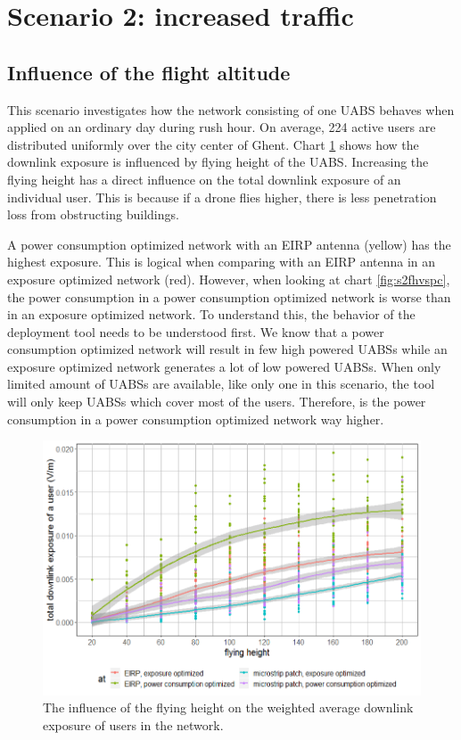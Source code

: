 \section{Scenario 2: increased traffic}

\subsection{Influence of the flight altitude}
This scenario investigates how the network consisting of one \gls{UABS} behaves when applied on an ordinary day during rush hour. 
On average, 224 active users are distributed uniformly over the city center of Ghent. 
Chart \ref{fig:s2fhvsdl} shows how the downlink exposure is influenced by flying height of the \gls{UABS}. 
Increasing the flying height has a direct influence on the total downlink exposure of an individual user. 
This is because if a drone flies higher, there is less penetration loss from obstructing buildings.

A power consumption optimized network with an \gls{EIRP} antenna (yellow) has the highest exposure. 
This is logical when comparing with an EIRP antenna in an exposure optimized network (red). 
However, when looking at chart \ref{fig:s2fhvspc}, the power consumption in a power consumption optimized network is worse 
than in an exposure optimized network. To understand this, the behavior of the deployment tool needs to be understood first. 
We know that a power consumption optimized network will result in few high powered \gls{UABS}s while an exposure optimized network 
generates a lot of low powered \gls{UABS}s. When only limited amount of \gls{UABS}s are available, 
like only one in this scenario, the tool will only keep \gls{UABS}s which cover most of the users. 
Therefore, is the power consumption in a power consumption optimized network way higher. 

\begin{figure}[h!]
  \includegraphics[width=\textwidth]{../results/s2/fhvsdl.png}
  \caption{The influence of the flying height on the weighted average downlink exposure of users in the network.}
  \label{fig:s2fhvsdl}
\end{figure}

